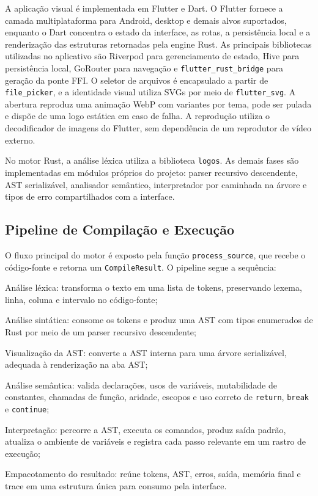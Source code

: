 \documentclass[
    12pt
    ,oneside
    ,a4paper
    ,chapter=TITLE
    ,section=TITLE
    ,sumario=abnt-6027-2012]{abntex2}
\begin{document}
A aplicação visual é implementada em Flutter e Dart. O Flutter fornece a camada
multiplataforma para Android, desktop e demais alvos suportados, enquanto o Dart concentra o
estado da interface, as rotas, a persistência local e a renderização das estruturas retornadas
pela engine Rust. As principais bibliotecas utilizadas no aplicativo são Riverpod para
gerenciamento de estado, Hive para persistência local, GoRouter para navegação e
\texttt{flutter\_rust\_bridge} para geração da ponte FFI.
O seletor de arquivos é encapsulado a partir de \texttt{file\_picker}, e a identidade
visual utiliza SVGs por meio de \texttt{flutter\_svg}. A abertura reproduz uma animação
WebP com variantes por tema, pode ser pulada e dispõe de uma logo estática em caso de
falha. A reprodução utiliza o decodificador de imagens do Flutter, sem dependência de
um reprodutor de vídeo externo.

No motor Rust, a análise léxica utiliza a biblioteca \texttt{logos}. As demais fases são
implementadas em módulos próprios do projeto: parser recursivo descendente, AST serializável,
analisador semântico, interpretador por caminhada na árvore e tipos de erro compartilhados
com a interface.

\subsection{Pipeline de Compilação e Execução}

O fluxo principal do motor é exposto pela função \texttt{process\_source}, que recebe o
código-fonte e retorna um \texttt{CompileResult}. O pipeline segue a sequência:

\begin{alineas}
    \item Análise léxica: transforma o texto em uma lista de tokens, preservando lexema, linha, coluna e intervalo no código-fonte;
    \item Análise sintática: consome os tokens e produz uma AST com tipos enumerados de Rust por meio de um parser recursivo descendente;
    \item Visualização da AST: converte a AST interna para uma árvore serializável, adequada à renderização na aba AST;
    \item Análise semântica: valida declarações, usos de variáveis, mutabilidade de constantes, chamadas de função, aridade, escopos e uso correto de \texttt{return}, \texttt{break} e \texttt{continue};
    \item Interpretação: percorre a AST, executa os comandos, produz saída padrão, atualiza o ambiente de variáveis e registra cada passo relevante em um rastro de execução;
    \item Empacotamento do resultado: reúne tokens, AST, erros, saída, memória final e trace em uma estrutura única para consumo pela interface.
\end{alineas}
\end{document}
